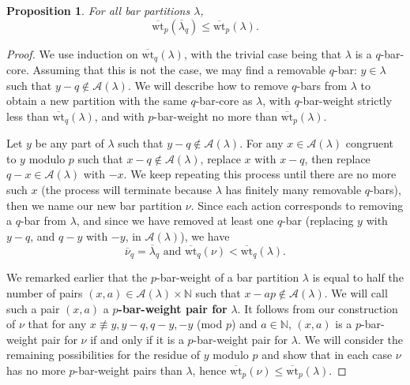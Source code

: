 \documentclass[10pt]{amsart}
\newtheorem{prop}{Proposition}[section]
\begin{document}
\begin{prop}\label{prop1}
For all bar partitions $\lambda$, 
$$\overline{\text{wt}}_p(\overline{\lambda}_q)\leq\overline{\text{wt}}_p(\lambda).$$
\end{prop}
\begin{proof}
We use induction on $\overline{\text{wt}}_q(\lambda)$, with the trivial case being that $\lambda$ is a $q$-bar-core. Assuming that this is not the case, we may find a removable $q$-bar: $y\in\lambda$ such that $y-q\not\in\mathcal{A}(\lambda)$. We will describe how to remove $q$-bars from $\lambda$ to obtain a new partition with the same $q$-bar-core as $\lambda$, with $q$-bar-weight strictly less than $\overline{\text{wt}}_q(\lambda)$, and with $p$-bar-weight no more than $\overline{\text{wt}}_p(\lambda)$.

Let $y$ be any part of $\lambda$ such that $y-q\not\in\mathcal{A}(\lambda)$. For any $x\in\mathcal{A}(\lambda)$ congruent to $y$ modulo $p$ such that $x-q\not\in\mathcal{A}(\lambda)$, replace $x$ with $x-q$, then replace $q-x\in\mathcal{A}(\lambda)$ with $-x$. We keep repeating this process until there are no more such $x$ (the process will terminate because $\lambda$ has finitely many removable $q$-bars), then we name our new bar partition $\nu$. Since each action corresponds to removing a $q$-bar from $\lambda$, and since we have removed at least one $q$-bar (replacing $y$ with $y-q$, and $q-y$ with $-y$, in $\mathcal{A}(\lambda)$), we have 
$$\overline{\nu}_q=\overline{\lambda}_q\text{ and }\overline{\text{wt}}_q(\nu)<\overline{\text{wt}}_q(\lambda).$$ 

We remarked earlier that the $p$-bar-weight of a bar partition $\lambda$ is equal to half the number of pairs $(x,a)\in\mathcal{A}(\lambda)\times\mathbb{N}$ such that $x-ap\not\in\mathcal{A}(\lambda)$. We will call such a pair $(x,a)$ a $p$\textbf{-bar-weight pair for} $\lambda$. It follows from our construction of $\nu$ that for any $x\not\equiv y,y-q,q-y,-y$ (mod $p$) and $a\in\mathbb{N}$, $(x,a)$ is a $p$-bar-weight pair for $\nu$ if and only if it is a $p$-bar-weight pair for $\lambda$. We will consider the remaining possibilities for the residue of $y$ modulo $p$ and show that in each case $\nu$ has no more $p$-bar-weight pairs than $\lambda$, hence $\overline{\text{wt}}_p(\nu)\leq\overline{\text{wt}}_p(\lambda)$. 


\end{proof}
\end{document}
